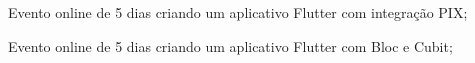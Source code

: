 \documentclass[
    10pt,
    english,
]{article}
\begin{document}
\noindent {}
{\tab[0.01cm] Evento online de 5 dias criando um aplicativo Flutter com integração PIX;}

\noindent {}
{\tab[0.01cm] Evento online de 5 dias criando um aplicativo Flutter com Bloc e Cubit;}

\end{document}
